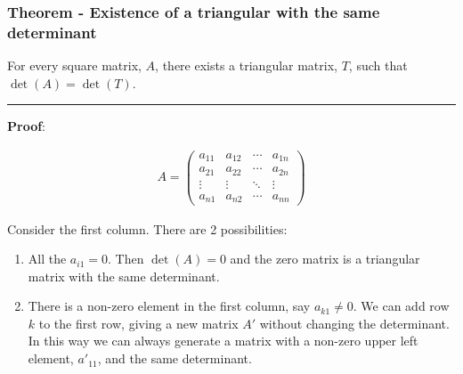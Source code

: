 \documentclass[usenames,dvipsnames,aspectratio=169,10pt]{beamer}
\numberwithin{equation}{section}
\begin{document}
\begin{frame}
\frametitle{Theorem - Existence of a triangular with the same determinant}
For every square matrix, $A$, there exists a triangular matrix, $T$, such that $\det(A)=\det(T)$.

\vspace{-0.5cm}\begin{center} \textcolor{airforceblue}{\rule{0.7\textwidth}{0.3mm}} \end{center}\vspace{-0.2cm}

\textbf{Proof}:

\noindent \begin{minipage}{0.3\textwidth}
\begin{align*}
A =
\begin{pmatrix}
a_{11} & a_{12} & \cdots & a_{1n} \\
a_{21} & a_{22} & \cdots & a_{2n} \\
\vdots & \vdots & \ddots & \vdots \\
a_{n1} & a_{n2} & \cdots & a_{nn}
\end{pmatrix}
\end{align*}
\end{minipage}\hfill
\begin{minipage}{0.68\textwidth}
Consider the first column. There are 2 possibilities:
\begin{enumerate}
\item All the $a_{i1}=0$. Then $\det(A)=0$ and the zero matrix is a triangular matrix with the same determinant.
\item There is a non-zero element in the first column, say $a_{k1}\neq 0$. We can add row $k$ to the first row, giving a new matrix $A'$ without changing the determinant. In this way we can always generate a matrix with a non-zero upper left element, $a'_{11}$, and the same determinant.
\end{enumerate}
\end{minipage}
\end{frame}
\end{document}
